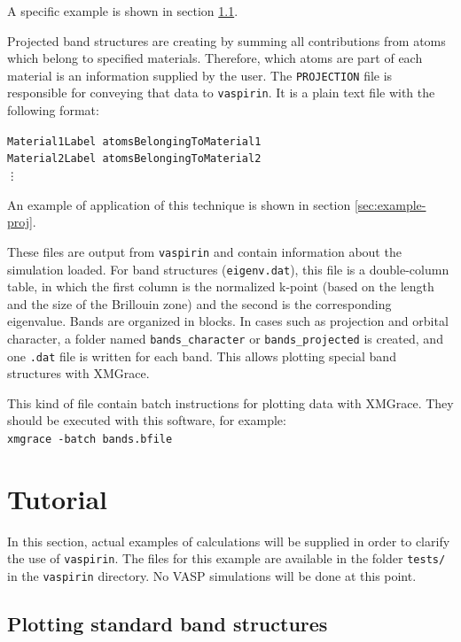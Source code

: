 \documentclass{refart}
\begin{document}
A specific example is shown in section \ref{sec:example-bands}.

 Projected band structures are creating by summing all contributions from atoms which belong to specified materials. Therefore, which atoms are part of each material is an information supplied by the user. The \texttt{PROJECTION} file is responsible for conveying that data to \texttt{vaspirin}. It is a plain text file with the following format:

\texttt{Material1Label atomsBelongingToMaterial1\\Material2Label atomsBelongingToMaterial2\\ \vdots}

An example of application of this technique is shown in section \ref{sec:example-proj}.

 These files are output from \texttt{vaspirin} and contain information about the simulation loaded. For band structures (\texttt{eigenv.dat}), this file is a double-column table, in which the first column is the normalized k-point (based on the length and the size of the Brillouin zone) and the second is the corresponding eigenvalue. Bands are organized in blocks. In cases such as projection and orbital character, a folder named \texttt{bands\_character} or \texttt{bands\_projected} is created, and one \texttt{.dat} file is written for each band. This allows plotting special band structures with XMGrace.

 This kind of file contain batch instructions for plotting data with XMGrace. They should be executed with this software, for example:\\
\texttt{xmgrace -batch bands.bfile}

\section{Tutorial}

In this section, actual examples of calculations will be supplied in order to clarify the use of \texttt{vaspirin}. The files for this example are available in the folder \texttt{tests/} in the \texttt{vaspirin} directory. No VASP simulations will be done at this point.

\subsection{Plotting standard band structures}\label{sec:example-bands}
\end{document}
